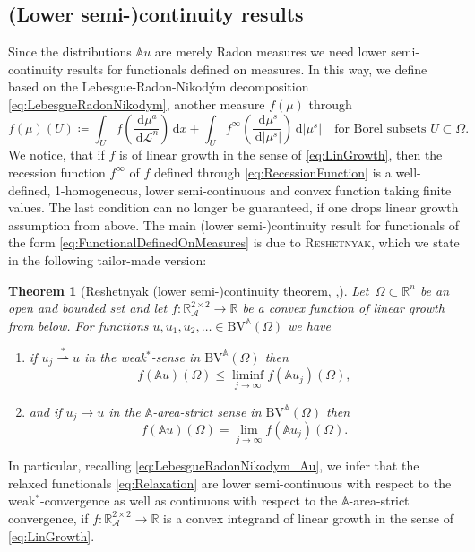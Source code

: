 \documentclass[a4paper,10pt,reqno,oneside]{amsart}
\numberwithin{equation}{section}
\newcommand{\R}{\mathbb R}
\newcommand{\A}{\mathscr{A}}
\newcommand{\Aop}{\mathbb{A}}
\newcommand{\Leb}{\mathscr{L}}
\newcommand{\BV}{\mathrm{BV}}
\newcommand{\dx}[1]{\,\mathrm{d}#1}
\newcommand{\abs}[1]{\left\lvert#1\right\rvert}
\newcommand{\weakstar}{\overset{\ast}{\rightharpoonup}}
\newtheorem{thm}{Theorem}[section]
\begin{document}
\subsection{(Lower semi-)continuity results}
Since the distributions $\Aop u$ are merely Radon measures we need lower semi-continuity results for functionals defined on measures. In this way, we define based on the Lebesgue-Radon-Nikod\'ym decomposition \eqref{eq:LebesgueRadonNikodym}, another measure $f(\mu)$ through
\begin{equation}\label{eq:FunctionalDefinedOnMeasures}
	f(\mu)(U) \coloneqq \int_U f\left(\frac{\dx{\mu^a}}{\dx{\Leb^n}}\right)\dx{x}+ \int_U f^\infty\left(\frac{\dx{\mu^s}}{\dx{\abs{\mu^s}}}\right)\dx{\abs{\mu^s}}\quad\mbox{for Borel subsets  }U\subset\Omega.
\end{equation}
We notice, that if $f$ is of linear growth in the sense of \eqref{eq:LinGrowth}, then the recession function $f^\infty$ of $f$ defined through \eqref{eq:RecessionFunction} is a well-defined, 1-homogeneous, lower semi-continuous and convex function taking finite values. The last condition can no longer be guaranteed, if one drops linear growth assumption from above.  The main (lower semi-)continuity result for functionals of the form \eqref{eq:FunctionalDefinedOnMeasures} is due to \textsc{Reshetnyak}, which we state in the following tailor-made version:
\begin{thm}[Reshetnyak (lower semi-)continuity theorem, {\cite{Reshetnyak},\cite[Thm. 2.4]{BeckSchmidt}}]\label{thm:Reshetnyak}
	Let \,$\Omega\subset\R^n$ be an open and bounded set and let $f\colon \R^{2\times 2}_\A\to \R$ be a convex function of linear growth from below. For functions $u,u_1,u_2,\dots\in \BV^{\Aop}(\Omega)$ we have
	\begin{enumerate}
		\item if $u_j\weakstar u$ in the weak$^\ast$-sense in $\BV^{\Aop}(\Omega)$ then 
		\begin{equation*}
			f(\Aop u)(\Omega) \leq \liminf_{j\to\infty} f(\Aop u_j)(\Omega),
		\end{equation*}
		\item and if $u_j\to u$ in the $\Aop$-area-strict sense in $\BV^{\Aop}(\Omega)$ then
		\begin{equation*}
			f(\Aop u)(\Omega) = \lim_{j\to\infty} f(\Aop u_j)(\Omega).
		\end{equation*}
	\end{enumerate}
\end{thm}
\noindent In particular, recalling \eqref{eq:LebesgueRadonNikodym_Au}, we infer that the relaxed functionals \eqref{eq:Relaxation} are lower semi-continuous with respect to the weak$^\ast$-convergence as well as continuous with respect to the $\Aop$-area-strict convergence, if $f\colon\R^{2\times2}_\A\to \R$ is a convex integrand of linear growth in the sense of \eqref{eq:LinGrowth}.
\end{document}
